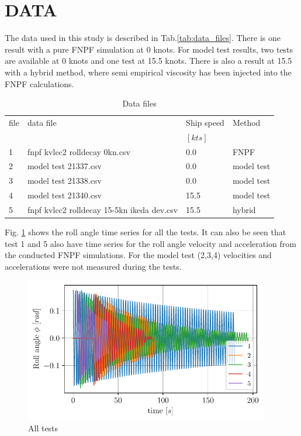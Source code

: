 \section*{DATA}\label{data}
The data used in this study is described in
Tab.\ref{tab:data_files}. There is one result with a pure FNPF
simulation at 0 knots. For model test results, two tests are available
at 0 knots and one test at 15.5 knots. There is also a result at 15.5
with a hybrid method, where semi empirical viscosity has been injected
into the FNPF calculations.
\begin{table}[H]
\scriptsize
\center
\caption{Data files}
\label{tab:tab:data_files}
\begin{tabular}{|l|l|l|l|}
\hline\addlinespace
file & data file & Ship speed & Method\\
&  & $[kts]$ & \\
\hline1 & fnpf kvlcc2 rolldecay 0kn.csv & 0.0 & FNPF\\
2 & model test 21337.csv & 0.0 & model test\\
3 & model test 21338.csv & 0.0 & model test\\
4 & model test 21340.csv & 15.5 & model test\\
5 & fnpf kvlcc2 rolldecay 15-5kn ikeda dev.csv & 15.5 & hybrid\\
\hline
\end{tabular}
\end{table}
Fig. \ref{fig:all_tests} shows the roll angle time series for
all the tests. It can also be seen that test 1 and 5 also have time
series for the roll angle velocity and acceleration from the conducted
FNPF simulations. For the model test (2,3,4) velocities and
accelerations were not measured during the tests.
\begin{figure}[H]
\begin{center}\includegraphics[width = 0.95\textwidth]{figures/all_tests.pdf}\end{center}
\vspace{-0.7cm}
\caption{All tests}
\label{fig:all_tests}
\end{figure}
